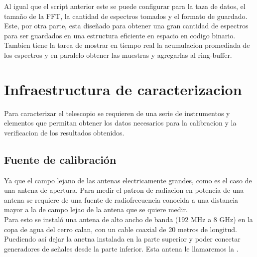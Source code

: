 Al igual que el script anterior este se puede configurar para la taza de datos, el tamaño de la FFT, la cantidad de espectros tomados y el formato de guardado. Este, por otra parte, esta diseñado para obtener una gran cantidad de espectros para ser guardados en una estructura eficiente en espacio en codigo binario. Tambien tiene la tarea de mostrar en tiempo real la acumulacion promediada de los espectros y en paralelo obtener las muestras y agregarlas al ring-buffer.\\


\section{Infraestructura de caracterizacion}

Para caracterizar el telescopio se requieren de una serie de instrumentos y elementos que permitan obtener los datos necesarios para la calibracion y la verificacion de los resultados obtenidos.\\

\subsection{Fuente de calibración}

Ya que el campo lejano de las antenas electricamente grandes, como es el caso de una antena de apertura. Para medir el patron de radiacion en potencia de una antena se requiere de una fuente de radiofrecuencia conocida a una distancia mayor a la de campo lejao de la antena que se quiere medir.\\

Para esto se instaló una antena de alto ancho de banda (192 MHz a 8 GHz) en la copa de agua del cerro calan, con un cable coaxial de 20 metros de longitud. Puediendo así dejar la anetna instalada en la parte superior y poder conectar generadores de señales desde la parte inferior. Esta antena le llamaremos la .\\

